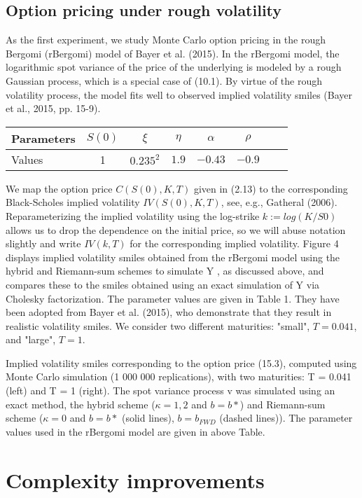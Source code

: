 \documentclass[12pt]{article}
\numberwithin{equation}{section}
\begin{document}
\subsection{Option pricing under rough volatility}
As the first experiment, we study Monte Carlo option pricing in the rough Bergomi (rBergomi) model of Bayer et al. (2015). In the rBergomi model, the logarithmic spot variance of the price of the underlying is modeled by a rough Gaussian process, which is a special case of (10.1). By virtue of the rough volatility process, the model fits well to observed implied volatility smiles (Bayer et al., 2015, pp. 15-9). \newline

\begin{tabular}{l*{6}{c}r}
Parameters & $S(0)$ & $\xi$ & $\eta$ & $\alpha$ & $\rho$ \\
\hline
Values & 1 & $0.235^2$ & $1.9$ & $-0.43$ & $-0.9$  \\
\end{tabular} \newline

We map the option price $C(S(0),K,T)$ given in (2.13) to the corresponding Black-Scholes implied volatility $IV(S(0),K,T)$, see, e.g., Gatheral (2006). Reparameterizing the implied volatility using the log-strike $k := log(K/S0)$ allows us to drop the dependence on the initial price, so we will abuse notation slightly and write $IV(k,T)$ for the corresponding implied volatility. Figure 4 displays implied volatility smiles obtained from the rBergomi model using the hybrid and Riemann-sum schemes to simulate Y , as discussed above, and compares these to the smiles obtained using an exact simulation of Y via Cholesky factorization. The parameter values are given in Table 1. They have been adopted from Bayer et al. (2015), who demonstrate that they result in realistic volatility smiles. We consider two different maturities: "small", $T = 0.041$, and "large", $T = 1$.

Implied volatility smiles corresponding to the option price (15.3), computed using Monte Carlo simulation (1 000 000 replications), with two maturities: T = 0.041 (left) and T = 1 (right). The spot variance process v was simulated using an exact method, the hybrid scheme ($\kappa = 1, 2$ and $b = b*$) and Riemann-sum scheme ($\kappa = 0$ and $b = b*$ (solid lines), $b = b_{FWD}$ (dashed lines)). The parameter values used in the rBergomi model are given in above Table.

\section{Complexity improvements}
\end{document}

